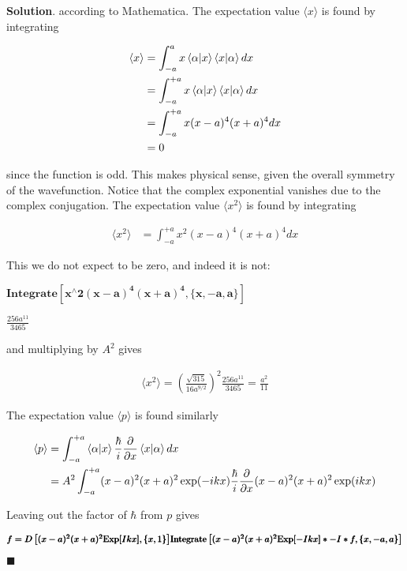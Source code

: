 \documentclass[12pt]{article}
\theoremstyle{definition}
\newenvironment{s}{%
        \begin{trivlist} \item \textbf{Solution}. }{%
            \hspace*{\fill} $\blacksquare$\end{trivlist}}%
\begin{document}
{\begin{s}
according to Mathematica. The expectation value $\langle x\rangle$ is found by integrating

\begin{align*}
\langle x \rangle &= \int_{-a}^{a} x\bra{\alpha}\ket{x}\bra{x}\ket{\alpha}dx \\
&= \int_{-a}^{+a} x\bra{\alpha}\ket{x}\bra{x}\ket{\alpha}dx \\
&= \int_{-a}^{+a} x (x-a)^{4}(x+a)^{4}dx\\
&= 0
\end{align*}

since the function is odd. This makes physical sense, given the overall symmetry of the wavefunction. Notice that the complex exponential vanishes due to the complex conjugation. The expectation value $\langle x^{2}\rangle$ is found by integrating

\begin{align*}
\langle x^{2} \rangle &= \int_{-a}^{+a} x^{2} (x-a)^{4}(x+a)^{4}dx
\end{align*}

This we do not expect to be zero, and indeed it is not: 

\begin{doublespace}
\noindent\(\pmb{\text{Integrate}\left[x{}^{\wedge}2(x-a)^4 (x+a)^4 ,\{x,-a,a\}\right]}\)
\end{doublespace}

\begin{doublespace}
\noindent\(\frac{256 a^{11}}{3465}\)
\end{doublespace}

and multiplying by $A^{2}$ gives 

\begin{align*}
\langle x^{2} \rangle = \left(\frac{\sqrt{315}}{16 a^{9/2}}\right)^{2}\frac{256 a^{11}}{3465} = \frac{a^{2}}{11}
\end{align*}

The expectation value $\langle p\rangle$ is found similarly

\begin{align*}
\langle p \rangle &= \int_{-a}^{+a} \bra{\alpha}\ket{x}\frac{\hbar}{i}\frac{\partial}{\partial x}\bra{x}\ket{\alpha}dx\\
&= A^{2} \int_{-a}^{+a}(x-a)^{2}(x+a)^{2}\exp(-ikx)\frac{\hbar}{i}\frac{\partial}{\partial x}(x-a)^{2}(x+a)^{2}\exp(ikx)
\end{align*}

Leaving out the factor of $\hbar$ from $p$ gives 

\begin{doublespace}
\noindent\(\pmb{\text{}}\\
\pmb{f = D\left[(x-a)^2 (x+a)^2 \text{Exp}[I k x],\{x,1\}\right]}\\
\pmb{\text{Integrate}\left[(x-a)^2 (x+a)^2 \text{Exp}[-I k x]*-I *f,\{x,-a,a\}\right]}\)
\end{doublespace}


\end{s}}
\end{document}
